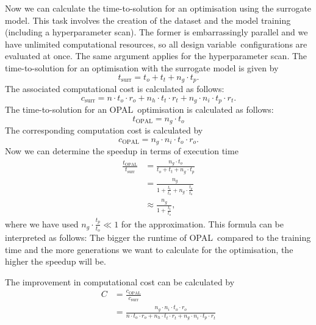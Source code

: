 \documentclass[a4paper, 12pt, version-1-compatibility]{article}
\def\opal{OPAL}
\def\dvar{design variable}
\begin{document}
Now we can calculate the time-to-solution for an optimisation using the surrogate model. This task involves the creation of the dataset and the model training (including a hyperparameter scan). The former is embarrassingly parallel and we have unlimited computational resources, so all \dvar\ configurations are evaluated at once. The same argument applies for the hyperparameter scan. The time-to-solution for an optimisation with the surrogate model is given by
\begin{equation*}
    t_\mathrm{surr} = t_o + t_t + n_g \cdot t_p.
\end{equation*}
The associated computational cost is calculated as follows:
\begin{equation*}
    c_\mathrm{surr} = n \cdot t_o \cdot r_o + n_h \cdot t_t \cdot r_t + n_g \cdot n_i \cdot t_p \cdot r_t.
\end{equation*}
The time-to-solution for an \opal\ optimisation is calculated as follows:
\begin{equation*}
    t_\mathrm{\opal} = n_g \cdot t_o
\end{equation*}
The corresponding computation cost is calculated by
\begin{equation*}
    c_\mathrm{\opal} = n_g \cdot n_i \cdot t_o \cdot r_o.
\end{equation*}
Now we can determine the speedup in terms of execution time
\begin{equation*}
    \begin{aligned}
    \frac{t_\mathrm{\opal}}{t_\mathrm{surr}} &= \frac{n_g \cdot t_o}{t_o + t_t + n_g \cdot t_p}\\
      &= \frac{n_g}{1 + \frac{t_t}{t_o} + n_g \cdot \frac{t_p}{t_o}}\\
      &\approx \frac{n_g}{1 + \frac{t_t}{t_o}},
    \end{aligned}
\end{equation*}
where we have used $n_g \cdot \frac{t_p}{t_o} \ll 1$ for the approximation. This formula can be interpreted as follows: The bigger the runtime of \opal\ compared to the training time and the more generations we want to calculate for the optimisation, the higher the speedup will be.

The improvement in computational cost can be calculated by
\begin{equation*}
    \begin{aligned}
        C &= \frac{c_\mathrm{\opal}}{c_\mathrm{surr}}\\
          &= \frac{n_g \cdot n_i \cdot t_o \cdot r_o}{n \cdot t_o \cdot r_o + n_h \cdot t_t \cdot r_t + n_g \cdot n_i \cdot t_p \cdot r_t}
    \end{aligned}
\end{equation*}
\end{document}
